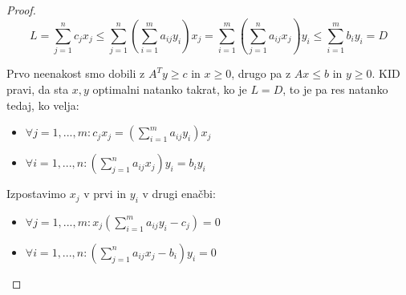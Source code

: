 \documentclass[11pt, a4paper]{article}
\begin{document}
    \begin{proof}
        \[L = \sum_{j=1}^n c_j x_j \le \sum_{j=1}^n (\sum_{i=1}^m a_{ij} y_i)x_j = \sum_{i=1}^m (\sum_{j=1}^n a_{ij} x_j)y_i \le \sum_{i=1}^m b_i y_i = D\]

        Prvo neenakost smo dobili z \(A^Ty \ge c\) in \(x \ge 0\), drugo pa z \(Ax \le b\) in \(y \ge 0\). KID pravi, da sta \(x,y\) optimalni natanko takrat, ko je \(L = D\), to je pa res natanko tedaj, ko velja:
        \begin{itemize}
            \item \(\displaystyle \forall j=1,...,m: c_j x_j = (\sum_{i=1}^m a_{ij} y_i)x_j\)
            \item \(\displaystyle \forall i=1,...,n: (\sum_{j=1}^n a_{ij} x_j)y_i = b_i y_i\)
        \end{itemize}

        Izpostavimo \(x_j\) v prvi in \(y_i\) v drugi enačbi:
        \begin{itemize}
            \item \(\displaystyle \forall j=1,...,m: x_j(\sum_{i=1}^m a_{ij} y_i - c_j) = 0\)
            \item \(\displaystyle \forall i=1,...,n: (\sum_{j=1}^n a_{ij} x_j - b_i)y_i = 0\)
        \end{itemize}
    \end{proof}
\end{document}
